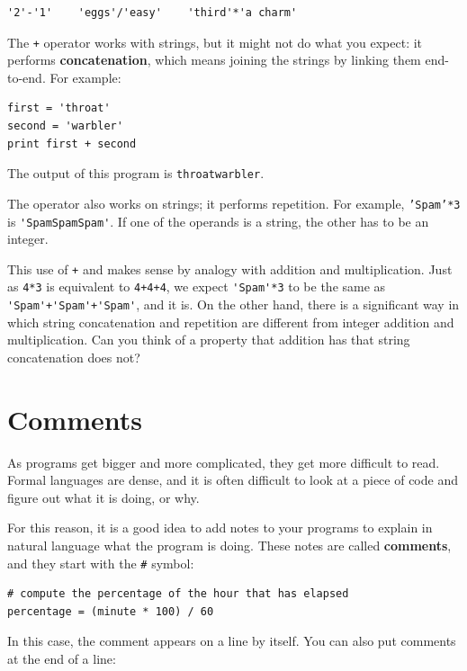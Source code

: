 \documentclass[10pt]{book}
\begin{document}
\beforeverb
\begin{verbatim}
'2'-'1'    'eggs'/'easy'    'third'*'a charm'
\end{verbatim}
\afterverb
%
The {\tt +} operator works with strings, but it
might not do what you expect: it performs
{\bf concatenation}, which means joining the strings by
linking them end-to-end.  For example:


\beforeverb
\begin{verbatim}
first = 'throat'
second = 'warbler'
print first + second
\end{verbatim}
\afterverb
%
The output of this program is {\tt throatwarbler}.

The {\tt *} operator also works on strings; it performs repetition.
For example, {\tt 'Spam'*3} is \verb"'SpamSpamSpam'".  If one of the operands
is a string, the other has to be an integer.

This use of {\tt +} and {\tt *} makes sense by
analogy with addition and multiplication.  Just as {\tt 4*3} is
equivalent to {\tt 4+4+4}, we expect \verb"'Spam'*3" to be the same as
\verb"'Spam'+'Spam'+'Spam'", and it is.  On the other hand, there is a
significant way in which string concatenation and repetition are
different from integer addition and multiplication.
Can you think of a property that addition has
that string concatenation does not?



\section{Comments}

As programs get bigger and more complicated, they get more difficult
to read.  Formal languages are dense, and it is often difficult to
look at a piece of code and figure out what it is doing, or why.

For this reason, it is a good idea to add notes to your programs to explain
in natural language what the program is doing.  These notes are called
{\bf comments}, and they start with the \verb"#" symbol:

\beforeverb
\begin{verbatim}
# compute the percentage of the hour that has elapsed
percentage = (minute * 100) / 60
\end{verbatim}
\afterverb
%
In this case, the comment appears on a line by itself.  You can also put
comments at the end of a line:
\end{document}
